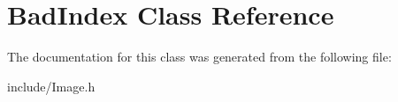 \hypertarget{classBadIndex}{\section{Bad\-Index Class Reference}
\label{classBadIndex}
}


The documentation for this class was generated from the following file\-:\begin{DoxyCompactItemize}
\item 
include/Image.\-h\end{DoxyCompactItemize}
